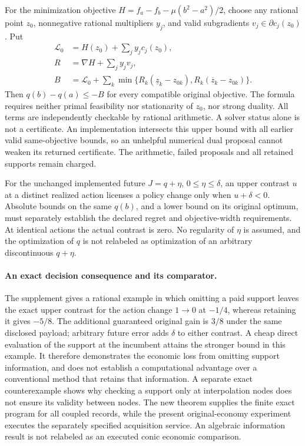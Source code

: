 For the minimization objective
$H=f_a-f_b-\mu(b^2-a^2)/2$, choose any rational point $z_0$,
nonnegative rational multipliers $y_j$, and valid subgradients
$v_j\in\partial c_j(z_0)$. Put
\begin{align}
 \mathcal L_0&=H(z_0)+\sum_jy_jc_j(z_0),\nonumber\\
 R&=\nabla H+\sum_jy_jv_j,\nonumber\\
 B&=\mathcal L_0+
 \sum_k\min\{R_k(\underline z_k-z_{0k}),
                         R_k(\overline z_k-z_{0k})\}.
 \label{eq:fullresidual125}
\end{align}
Then $q(b)-q(a)\le-B$ for every compatible original objective.
The formula requires neither primal feasibility nor stationarity of
$z_0$, nor strong duality. All terms are independently checkable by
rational arithmetic. A solver status alone is not a certificate.
An implementation intersects this upper bound with all earlier valid
same-objective bounds, so an unhelpful numerical dual proposal cannot
weaken its returned certificate. The arithmetic, failed proposals and
all retained supports remain charged.

For the unchanged implemented future $J=q+\eta$, $0\le\eta\le\delta$,
an upper contrast $u$ at a distinct realized action licenses a policy
change only when $u+\delta<0$. Absolute bounds on the same $q(b)$,
and a lower bound on its original optimum, must separately establish
the declared regret and objective-width requirements. At identical
actions the actual contrast is zero. No regularity of $\eta$ is
assumed, and the optimization of $q$ is not relabeled as optimization
of an arbitrary discontinuous $q+\eta$.

\paragraph{An exact decision consequence and its comparator.}
The supplement gives a rational example in which omitting a paid support
leaves the exact upper contrast for the action change $1\to0$ at
$-1/4$, whereas retaining it gives $-5/8$. The additional guaranteed
original gain is $3/8$ under the same disclosed payload; arbitrary future
error adds $\delta$ to either contrast. A cheap direct evaluation of the
support at the incumbent attains the stronger bound in this example.
It therefore demonstrates the economic loss from omitting support
information, and does not establish a computational advantage over a
conventional method that retains that information. A separate exact
counterexample shows why checking a support only at interpolation nodes
does not ensure its validity between nodes. The new theorem supplies
the finite exact program for all coupled records, while the present
original-economy experiment executes the separately specified acquisition
service. An algebraic information result is not relabeled as an executed
conic economic comparison.

